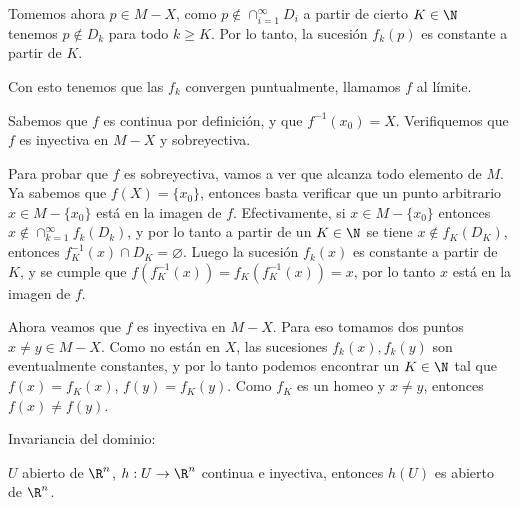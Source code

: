 \begin{dem}
    Tomemos ahora $p\in M-X$, como $p\not\in\cap_{i=1}^\infty D_i$ a partir de cierto $K\in\N$ tenemos $p\not\in D_k$ para todo $k\geq K$. Por lo tanto, la sucesión $f_k(p)$ es constante a partir de $K$.

    Con esto tenemos que las $f_k$ convergen puntualmente, llamamos $f$ al límite.

    Sabemos que $f$ es continua por definición, y que $f^{-1}(x_0)=X$. Verifiquemos que $f$ es inyectiva en $M-X$ y sobreyectiva.

    Para probar que $f$ es sobreyectiva, vamos a ver que alcanza todo elemento de $M$. Ya sabemos que $f(X)=\{x_0\}$, entonces basta verificar que un punto arbitrario $x\in M-\{x_0\}$ está en la imagen de $f$. Efectivamente, si $x\in M-\{x_0\}$ entonces $x\not\in \cap^\infty_{k=1} f_k(D_k)$, y por lo tanto a partir de un $K\in\N$ se tiene $x\not\in f_K(D_K)$, entonces $f_K^{-1}(x)\cap D_K=\varnothing$. Luego la sucesión $f_k(x)$ es constante a partir de $K$, y se cumple que $f(f^{-1}_K(x))=f_K(f^{-1}_K(x))=x$, por lo tanto $x$ está en la imagen de $f$.

    Ahora veamos que $f$ es inyectiva en $M-X$. Para eso tomamos dos puntos $x\neq y\in M-X$. Como no están en $X$, las sucesiones $f_k(x), f_k(y)$ son eventualmente constantes, y por lo tanto podemos encontrar un $K\in\N$ tal que $f(x) = f_K(x)$, $f(y) = f_K(y)$. Como $f_K$ es un homeo y $x\neq y$, entonces $f(x)\neq f(y)$.


\end{dem}

\begin{teo}
    Invariancia del dominio:

    $U$ abierto de $\R^n$, $h:U\to\R^n$ continua e inyectiva, entonces $h(U)$ es abierto de $\R^n$.
\end{teo}


